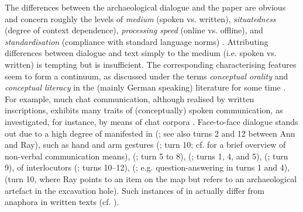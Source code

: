 \documentclass[output=paper]{langsci/langscibook}
\begin{document}
{The differences between the archaeological dialogue and the paper are obvious and concern roughly the levels of \emph{medium}  (spoken vs. written), \emph{situatedness}  (degree of context dependence), \emph{processing speed}  (online vs. offline), and \emph{standardisation}  (compliance with standard language norms) \citep{Klein:1985}.
%
Attributing differences between dialogue and text simply to the medium (i.e. spoken vs. written) is tempting but is insufficient. 
%
The corresponding characterising features seem to form a continuum, as discussed under the terms \emph{conceptual orality}  and \emph{conceptual literacy}  in the (mainly German speaking) literature for some time \citep{Koch:Oesterreicher:1985}.
%
For example, much chat communication, although realised by written inscriptions, exhibits many traits of (conceptually) spoken communication, as investigated, for instance, by means of chat corpora \citep{Beisswenger:et:al:2012:a}. 
%
Face-to-face dialogue stands out due to a high degree of  manifested in  (\citet{Tomasello:1998}; see also turns 2 and 12 between Ann and Ray),  such as hand and arm gestures (\citet{Kendon:2004,McNeill:2000:a}; turn 10; cf.  for a brief overview of non-verbal communication means),  (\citealp{Ginzburg:Fernandez:Schlangen:2014}; turn 5 to 8),  (\citealp{Fernandez:Ginzburg:2002,Fernandez:Ginzburg:Lappin:2007}; turns 1, 4, and 5),  (\citealp{Ginzburg:Breitholz:Cooper:Hough:Tian:2015}; turn 9),  of interlocutors (\citealp{Clark:Schreuder:Buttrick:1983}; turns 10--12),  (\citealp{Sacks:Schegloff:Jefferson:1974,heldner2010,levinson2015}; e.g. question-answering in turns 1 and 4),  (turn 10, where Ray points to an item on the map but refers to an archaeological artefact in the excavation hole). Such instances of  \citep{Nunberg:1993} in  actually differ from  anaphora \citep{Clark:1975} in written texts (cf. \citealp{Luecking:2018:a}).

}
\end{document}
